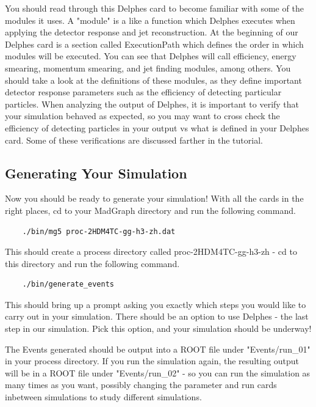 \documentclass{article}
\begin{document}
You should read through this Delphes card to become familiar with some of the modules it uses. A "module" is a like a function which Delphes executes
when applying the detector response and jet reconstruction. At the beginning of our Delphes card is a section called ExecutionPath which defines
the order in which modules will be executed. You can see that Delphes will call efficiency, energy smearing, momentum smearing, and jet finding modules,
among others. You should take a look at the definitions of these modules, as they define important detector response parameters such as the efficiency
of detecting particular particles. When analyzing the output of Delphes, it is important to verify that your simulation behaved as expected, so you may
want to cross check the efficiency of detecting particles in your output vs what is defined in your Delphes card. Some of these verifications are discussed
farther in the tutorial.

\subsection{Generating Your Simulation}

Now you should be ready to generate your simulation! With all the cards in the right places, cd to your MadGraph directory and run the following command.

\begin{verbatim}
	./bin/mg5 proc-2HDM4TC-gg-h3-zh.dat
\end{verbatim}

This should create a process directory called proc-2HDM4TC-gg-h3-zh - cd to this directory and run the following command.

\begin{verbatim}
	./bin/generate_events
\end{verbatim}

This should bring up a prompt asking you exactly which steps you would like to carry out in
your simulation. There should be an option to use Delphes - the last step in our simulation.
Pick this option, and your simulation should be underway!

\bigskip

The Events generated should be output into a ROOT file under "Events/run\_01" in your
process directory. If you run the simulation again, the resulting output will be in a
ROOT file under "Events/run\_02" - so you can run the simulation as many times as you
want, possibly changing the parameter and run cards inbetween simulations to study different simulations.
\end{document}
